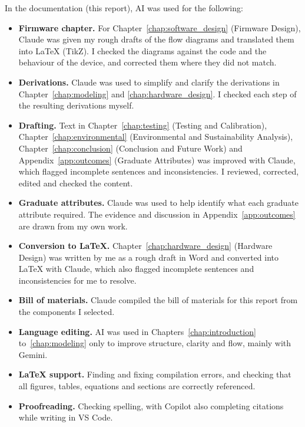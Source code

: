 In the documentation (this report), AI was used for the following:
\begin{itemize}[label=\textbullet]
  \item \textbf{Firmware chapter.} For Chapter~\ref{chap:software_design}
    (Firmware Design), Claude was given my rough drafts of the flow
    diagrams and translated them into \LaTeX{} (TikZ). I checked the
    diagrams against the code and the behaviour of the device, and
    corrected them where they did not match.
  \item \textbf{Derivations.} Claude was used to simplify and clarify the
    derivations in Chapter~\ref{chap:modeling} and \ref{chap:hardware_design}. I checked each step of
    the resulting derivations myself.
  \item \textbf{Drafting.} Text in Chapter~\ref{chap:testing} (Testing and
    Calibration), Chapter~\ref{chap:environmental} (Environmental and
    Sustainability Analysis), Chapter~\ref{chap:conclusion} (Conclusion
    and Future Work) and Appendix~\ref{app:outcomes} (Graduate Attributes)
    was improved with Claude, which flagged incomplete sentences and
    inconsistencies. I reviewed, corrected, edited and checked the content.

  \item \textbf{Graduate attributes.} Claude was used to help identify
    what each graduate attribute required. The evidence and discussion in
    Appendix~\ref{app:outcomes} are drawn from my own work.
  \item \textbf{Conversion to \LaTeX{}.} Chapter~\ref{chap:hardware_design}
    (Hardware Design) was written by me as a rough draft in Word and
    converted into \LaTeX{} with Claude, which also flagged incomplete
    sentences and inconsistencies for me to resolve.
  \item \textbf{Bill of materials.} Claude compiled the bill of materials
    for this report from the components I selected.
  \item \textbf{Language editing.} AI was used in Chapters~\ref{chap:introduction}
    to~\ref{chap:modeling} only to improve structure, clarity and flow,
    mainly with Gemini.
  \item \textbf{\LaTeX{} support.} Finding and fixing compilation errors,
    and checking that all figures, tables, equations and sections are
    correctly referenced.
  \item \textbf{Proofreading.} Checking spelling, with Copilot also
    completing citations while writing in VS Code.
\end{itemize}

